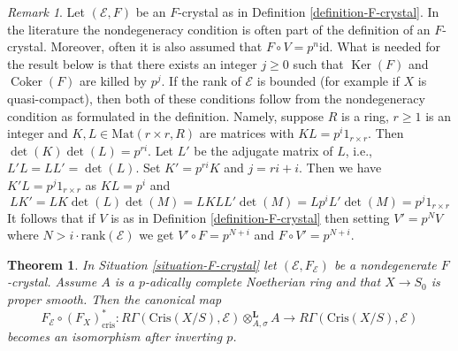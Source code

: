 \documentclass{stacks-project}
\theoremstyle{plain}
\newtheorem{theorem}[subsection]{Theorem}
\theoremstyle{definition}
\theoremstyle{remark}
\newtheorem{remark}[subsection]{Remark}
\numberwithin{equation}{subsection}
\def\Ker{\mathop{\mathrm{Ker}}}
\def\Coker{\mathop{\mathrm{Coker}}}
\begin{document}
\begin{remark}
\label{remark-F-crystal-variants}
Let $(\mathcal{E}, F)$ be an $F$-crystal as in
Definition \ref{definition-F-crystal}.
In the literature the nondegeneracy condition is often part of the
definition of an $F$-crystal. Moreover, often it is also assumed that
$F \circ V = p^n\text{id}$. What is needed for the result below is
that there exists an integer $j \geq 0$ such that $\Ker(F)$ and
$\Coker(F)$ are killed by $p^j$. If the rank of $\mathcal{E}$
is bounded (for example if $X$ is quasi-compact), then both of these
conditions follow from the nondegeneracy condition as formulated in
the definition. Namely, suppose $R$ is a ring, $r \geq 1$ is an integer and
$K, L \in \text{Mat}(r \times r, R)$ are matrices with
$K L = p^i 1_{r \times r}$. Then $\det(K)\det(L) = p^{ri}$. 
Let $L'$ be the adjugate matrix of $L$, i.e.,
$L' L = L L' = \det(L)$. Set $K' = p^{ri} K$ and $j = ri + i$.
Then we have $K' L = p^j 1_{r \times r}$ as $K L = p^i$ and
$$
L K' = L K \det(L) \det(M) = L K L L' \det(M) = L p^i L' \det(M) =
p^j 1_{r \times r}
$$
It follows that if $V$ is as in Definition \ref{definition-F-crystal}
then setting $V' = p^N V$ where $N > i \cdot \text{rank}(\mathcal{E})$
we get $V' \circ F = p^{N + i}$ and $F \circ V' = p^{N + i}$.
\end{remark}

\begin{theorem}
\label{theorem-cohomology-F-crystal}
In Situation \ref{situation-F-crystal} let $(\mathcal{E}, F_\mathcal{E})$
be a nondegenerate $F$-crystal. Assume $A$ is a $p$-adically complete
Noetherian ring and that $X \to S_0$ is proper smooth. Then
the canonical map
$$
F_\mathcal{E} \circ (F_X)_{\text{cris}}^* :
R\Gamma(\text{Cris}(X/S), \mathcal{E}) \otimes^\mathbf{L}_{A, \sigma} A
\longrightarrow
R\Gamma(\text{Cris}(X/S), \mathcal{E})
$$
becomes an isomorphism after inverting $p$.
\end{theorem}
\end{document}
